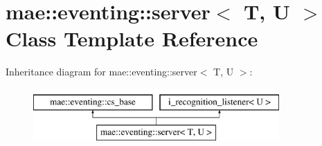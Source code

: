 \hypertarget{classmae_1_1eventing_1_1server}{\section{mae\-:\-:eventing\-:\-:server$<$ T, U $>$ Class Template Reference}
\label{classmae_1_1eventing_1_1server}
}
Inheritance diagram for mae\-:\-:eventing\-:\-:server$<$ T, U $>$\-:\begin{figure}[H]
\begin{center}
\leavevmode
\includegraphics[height=2.000000cm]{classmae_1_1eventing_1_1server}
\end{center}
\end{figure}
